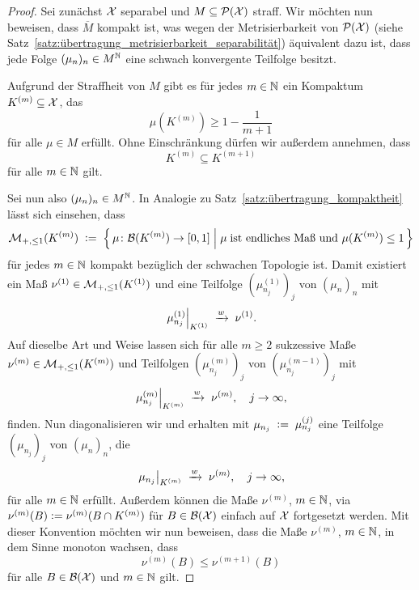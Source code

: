 \documentclass[../thesis/thesis.tex]{subfiles}
\begin{document}
	\begin{proof}
		Sei zunächst $\mathcal{X}$ separabel und $M \subseteq \mathcal{P}(\mathcal{X})$ straff. Wir möchten nun beweisen, dass $\overline{M}$ 
		kompakt ist, was wegen der Metrisierbarkeit von $\mathcal{P}(\mathcal{X})$ (siehe Satz~\ref{satz:übertragung_metrisierbarkeit_separabilität}) äquivalent dazu ist,
		dass jede Folge $(\mu_n)_n \in M^{\mathbb{N}}$ eine schwach konvergente Teilfolge besitzt. 
		
		Aufgrund der Straffheit von $M$ gibt es für jedes $m \in \mathbb{N}$ ein Kompaktum $K^{(m)} \subseteq \mathcal{X}$, 
		das
		\[ \mu(K^{(m)}) \geq 1 - \frac{1}{m+1} \label{glg:5.2} \tag{5.2} \]
		für alle $\mu \in M$
		erfüllt. Ohne Einschränkung dürfen wir außerdem annehmen, dass 
		\[ K^{(m)} \subseteq K^{(m+1)} \label{glg:5.3} \tag{5.3} \] 
		für alle $m \in \mathbb{N}$ gilt.
		
		Sei nun also $(\mu_n)_n \in M^{\mathbb{N}}$.
		In Analogie zu Satz~\ref{satz:übertragung_kompaktheit} lässt sich einsehen, dass 
		\[ \mathcal{M}_{+,\leq 1}(K^{(m)}) \; \vcentcolon = \; \left\{\, \mu \colon \mathcal{B}(K^{(m)}) \to [0,1] \; \middle| \; \mu \; 
			\text{ist endliches Maß und } \mu(K^{(m)}) \leq 1 \,\right\} \]
		für jedes $m \in \mathbb{N}$ kompakt bezüglich der schwachen Topologie ist. Damit existiert ein Maß 
		$\nu^{(1)} \in \mathcal{M}_{+,\leq 1}(K^{(1)})$ und eine Teilfolge $(\mu_{n_j}^{(1)})_j$ von $(\mu_n)_n$ mit
		\[ \left.\mu_{n_j}^{(1)}\right|_{K^{(1)}} \; \xrightarrow{w} \; \nu^{(1)} \text{.} \]
		Auf dieselbe Art und Weise lassen sich für alle $m\geq 2$ sukzessive Maße 
		$\nu^{(m)} \in \mathcal{M}_{+,\leq 1}(K^{(m)})$ und Teilfolgen $(\mu_{n_j}^{(m)})_j$ von $(\mu_{n_j}^{(m-1)})_j$ mit
		\[ \left.\mu_{n_j}^{(m)}\right|_{K^{(m)}} \; \xrightarrow{w} \; \nu^{(m)}, \quad j \to \infty \text{,} \]
		finden.
		Nun diagonalisieren wir und erhalten mit $\mu_{n_j} \; \vcentcolon = \; \mu_{n_j}^{(j)}$ eine Teilfolge 
		$(\mu_{n_j})_j$ von $(\mu_n)_n$, die
		\[ \left.\mu_{n_j}\right|_{K^{(m)}} \; \xrightarrow{w} \; \nu^{(m)}, \quad j \to \infty \text{,} \]
		für alle $m \in \mathbb{N}$ erfüllt.
		Außerdem können die Maße $\nu^{(m)}$, $m \in \mathbb{N}$, via 
		$\nu^{(m)}(B) \vcentcolon = \nu^{(m)}(B \cap K^{(m)})$ für $B \in \mathcal{B}(\mathcal{X})$ einfach auf $\mathcal{X}$ fortgesetzt werden. 
		Mit dieser Konvention möchten wir nun beweisen, dass die Maße
		$\nu^{(m)}$, $m \in \mathbb{N}$, in dem Sinne monoton wachsen, dass 
		\[ \nu^{(m)}(B) \leq \nu^{(m+1)}(B) \label{glg:5.4} \tag{5.4} \]
		für alle $B \in \mathcal{B}(\mathcal{X})$ und $m \in \mathbb{N}$ gilt.
		

\end{proof}
\end{document}
